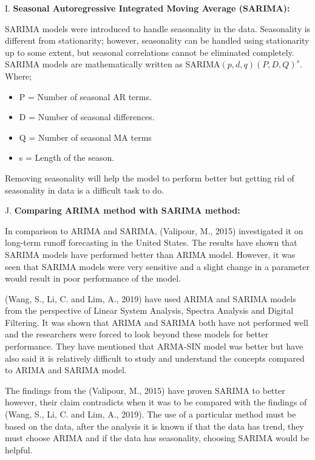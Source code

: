 \documentclass[10pt]{report}
\begin{document}
\begin{flushleft}
		I.	\textbf{Seasonal Autoregressive Integrated Moving Average (SARIMA):}
		
		SARIMA models were introduced to handle seasonality in the data. Seasonality is different from stationarity; however, seasonality can be handled using stationarity up to some extent, but seasonal correlations cannot be eliminated completely. SARIMA models are mathematically written as SARIMA$(p,d,q)(P,D,Q)^{s}$.
		Where;
		\begin{itemize}
		\item	P = Number of seasonal AR terms.\item D = Number of seasonal differences. \item Q = Number of seasonal MA terms \item s = Length of the season.
		\end{itemize}
		  Removing seasonality will help the model to perform better but getting rid of seasonality in data is a difficult task to do.
		
		J.	\textbf{Comparing ARIMA method with SARIMA method:}
		
		In comparison to ARIMA and SARIMA, (Valipour, M., 2015) investigated it on long-term runoff forecasting in the United States. The results have shown that SARIMA models have performed better than ARIMA model. However, it was seen that SARIMA models were very sensitive and a slight change in a parameter would result in poor performance of the model.
		
		(Wang, S., Li, C. and Lim, A., 2019) have used ARIMA and SARIMA models from the perspective of Linear System Analysis, Spectra Analysis and Digital Filtering. It was shown that ARIMA and SARIMA both have not performed well and  the researchers were forced to look beyond these models for better performance. They have mentioned that ARMA-SIN model was better but have also said it is relatively difficult to study and understand the concepts compared to ARIMA and SARIMA model.
		
		The findings from the (Valipour, M., 2015) have proven SARIMA to better however, their claim contradicts when it was to be compared with the findings of (Wang, S., Li, C. and Lim, A., 2019). The use of a particular method must be based on the data, after the analysis it is known if that the data has trend, they must choose ARIMA and if the data has seasonality, choosing SARIMA would be helpful. 
		

\end{flushleft}
\end{document}
